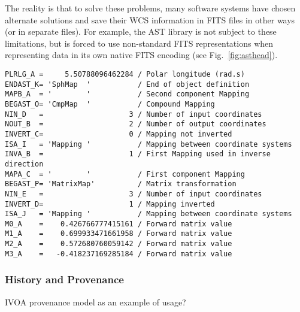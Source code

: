 \documentclass[final,authoryear,5p,times,twocolumn]{elsarticle}
\begin{document}
The reality is that to solve these problems, many software systems
have chosen alternate solutions and save their WCS information in FITS
files in other ways (or in separate files). For example, the AST
library \citep{1998ASPC..145...41W,2012ASPC..461..825B} is not subject
to these limitations, but is forced to use non-standard FITS
representations when representing data in its own native FITS
encoding (see Fig.\ \ref{fig:asthead}).

\begin{figure*}
\begin{minipage}{\textwidth}
\begin{center}
\begin{verbatim}
PLRLG_A =     5.50788096462284 / Polar longitude (rad.s)
ENDAST_K= 'SphMap  '           / End of object definition
MAPB_A  = '        '           / Second component Mapping
BEGAST_O= 'CmpMap  '           / Compound Mapping
NIN_D   =                    3 / Number of input coordinates
NOUT_B  =                    2 / Number of output coordinates
INVERT_C=                    0 / Mapping not inverted
ISA_I   = 'Mapping '           / Mapping between coordinate systems
INVA_B  =                    1 / First Mapping used in inverse direction
MAPA_C  = '        '           / First component Mapping
BEGAST_P= 'MatrixMap'          / Matrix transformation
NIN_E   =                    3 / Number of input coordinates
INVERT_D=                    1 / Mapping inverted
ISA_J   = 'Mapping '           / Mapping between coordinate systems
M0_A    =    0.426766777415161 / Forward matrix value
M1_A    =    0.699933471661958 / Forward matrix value
M2_A    =    0.572680760059142 / Forward matrix value
M3_A    =   -0.418237169285184 / Forward matrix value
\end{verbatim}
\end{center}
\caption{Example header of a representation of an AST WCS object in
  Native form.}
\label{fig:asthead}
\end{minipage}
\end{figure*}


\subsubsection{History and Provenance}


IVOA provenance model as an example of usage?
\end{document}

